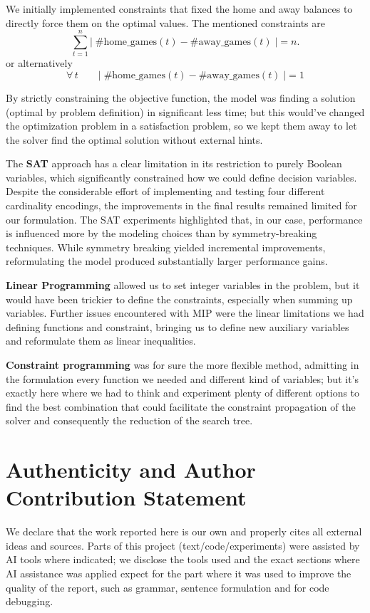 \documentclass{article}
\begin{document}
We initially implemented constraints that fixed the home and away balances to directly force them on the optimal values. The mentioned constraints are
\[
\sum_{t=1}^{n}\big| \; 
\#\text{home\_games}(t) - \#\text{away\_games}(t) \; \big| = n.
\]
or alternatively
\[
\forall\, t \qquad \big| \; 
\#\text{home\_games}(t) - \#\text{away\_games}(t) \; \big| = 1
\]

By strictly constraining the objective function, the model was finding a solution (optimal by problem definition) in significant less time; but this would've changed the optimization problem in a satisfaction problem, so we kept them away to let the solver find the optimal solution without external hints.

The \textbf{SAT} approach has a clear limitation in its restriction to purely Boolean variables, which significantly constrained how we could define decision variables. Despite the considerable effort of implementing and testing four different cardinality encodings, the improvements in the final results remained limited for our formulation.
The SAT experiments highlighted that, in our case, performance is influenced more by the modeling choices than by symmetry-breaking techniques. While symmetry breaking yielded incremental improvements, reformulating the model produced substantially larger performance gains.

\textbf{Linear Programming} allowed us to set integer variables in the problem, but it would have been trickier to define the constraints, especially when summing up variables. Further issues encountered with MIP were the linear limitations we had defining functions and constraint, bringing us to define new auxiliary variables and reformulate them as linear inequalities.

\textbf{Constraint programming} was for sure the more flexible method, admitting in the formulation every function we needed and different kind of variables; but it's exactly here where we had to think and experiment plenty of different options to find the best combination that could facilitate the constraint propagation of the solver and consequently the reduction of the search tree.

\newpage
\section*{Authenticity and Author Contribution Statement}
We declare that the work reported here is our own and properly cites all external ideas and sources.
Parts of this project (text/code/experiments) were assisted by AI tools where indicated; we disclose the tools used and the exact sections where AI assistance was applied expect for the part where it was used to improve the quality of the report, such as grammar, sentence formulation and for code debugging.
\\[0.5em]
\end{document}

